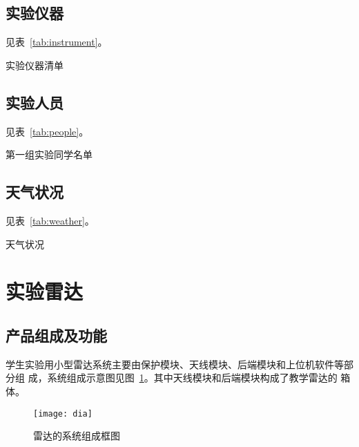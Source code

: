 \documentclass[../main]{subfiles}
\begin{document}
\subsection{实验仪器}%
\label{sub:instrument}

见表~\ref{tab:instrument}。

\begin{table}[htbp]
  \centering
  \caption{实验仪器清单}%
  \label{tab:instrument}
\end{table}

\subsection{实验人员}%
\label{sub:people}

见表~\ref{tab:people}。

\begin{table}[htbp]
  \centering
  \caption{第一组实验同学名单}%
  \label{tab:people}
\end{table}

\subsection{天气状况}%
\label{sub:weather}

见表~\ref{tab:weather}。

\begin{table}[htbp]
  \centering
  \caption{天气状况}%
  \label{tab:weather}
\end{table}

\section{实验雷达}%
\label{sec:radar}

\subsection{产品组成及功能}%
\label{sub:composition}

学生实验用小型雷达系统主要由保护模块、天线模块、后端模块和上位机软件等部分组
成，系统组成示意图见图~\ref{fig:dia}。其中天线模块和后端模块构成了教学雷达的
箱体。

\begin{figure}[htbp]
  \centering
  \texttt{[image: dia]}
  \caption{雷达的系统组成框图}%
  \label{fig:dia}
\end{figure}
\end{document}
